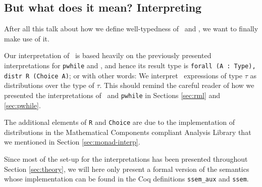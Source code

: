 \documentclass[11pt, leqno, titlepage]{article}
\def\coqe{\lstinline[language=Coq, basicstyle=\small]}
\theoremstyle{definition}
\begin{document}
\subsection{But what does it mean? Interpreting \srml}
After all this talk about how we define well-typedness of \rmlx\ and \srml, we want
to finally make use of it.

Our interpretation of \srml\ is based heavily on the previously presented
interpretations for \texttt{pwhile} and \rml, and hence its result type is
\coqe{forall (A : Type), distr R (Choice A)}; or with other words: We interpret
\srml\ expressions of type $\tau$ as distributions over the type of $\tau$. This
should remind the careful reader of how we presented the interpretations of \rml\ and
\texttt{pwhile} in Sections \ref{sec:rml} and \ref{sec:pwhile}.

The additional elements of \coqe{R} and \coqe{Choice} are due to the implementation
of distributions in the Mathematical Components compliant Analysis Library that we
mentioned in Section \ref{sec:monad-interp}.

Since most of the set-up for the interpretations has been presented throughout
Section \ref{sec:theory}, we will here only present a formal version of the
semantics whose implementation can be found in the Coq definitions \coqe{ssem_aux}
and \coqe{ssem}. 
\end{document}
